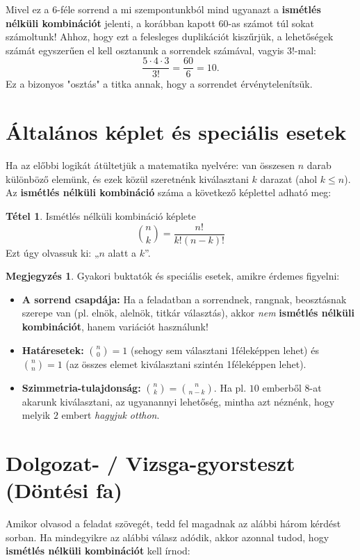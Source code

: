 \documentclass[a4paper,12pt]{article}
\theoremstyle{definition} %
\newtheorem*{theorem}{Tétel}
\newtheorem*{remark}{\mytriangle{bvred} Megjegyzés}
\begin{document}
Mivel ez a $6$-féle sorrend a mi szempontunkból mind ugyanazt a \textbf{ismétlés nélküli kombinációt} jelenti, a korábban kapott $60$-as számot túl sokat számoltunk! Ahhoz, hogy ezt a felesleges duplikációt kiszűrjük, a lehetőségek számát egyszerűen el kell osztanunk a sorrendek számával, vagyis $3!$-mal:
$$\frac{5 \cdot 4 \cdot 3}{3!} = \frac{60}{6} = 10.$$
Ez a bizonyos "osztás" a titka annak, hogy a sorrendet érvénytelenítsük.

\section{Általános képlet és speciális esetek}
Ha az előbbi logikát átültetjük a matematika nyelvére: van összesen $n$ darab különböző elemünk, és ezek közül szeretnénk kiválasztani $k$ darazat (ahol $k \le n$). Az \textbf{ismétlés nélküli kombináció} száma a következő képlettel adható meg:

\begin{theorem}{Ismétlés nélküli kombináció képlete}
$$\binom{n}{k} = \frac{n!}{k!(n-k)!}$$
Ezt úgy olvassuk ki: „$n$ alatt a $k$”.
\end{theorem}

\begin{remark}
Gyakori buktatók és speciális esetek, amikre érdemes figyelni:
\begin{itemize}
    \item \textbf{A sorrend csapdája:} Ha a feladatban a sorrendnek, rangnak, beosztásnak szerepe van (pl. elnök, alelnök, titkár választás), akkor \textit{nem} \textbf{ismétlés nélküli kombinációt}, hanem variációt használunk!
    \item \textbf{Határesetek:} $\binom{n}{0} = 1$ (sehogy sem választani 1féleképpen lehet) és $\binom{n}{n} = 1$ (az összes elemet kiválasztani szintén 1féleképpen lehet).
    \item \textbf{Szimmetria-tulajdonság:} $\binom{n}{k} = \binom{n}{n-k}$. Ha pl. $10$ emberből $8$-at akarunk kiválasztani, az ugyanannyi lehetőség, mintha azt néznénk, hogy melyik $2$ embert \textit{hagyjuk otthon}.
\end{itemize}
\end{remark}

\section{Dolgozat- / Vizsga-gyorsteszt (Döntési fa)}
Amikor olvasod a feladat szövegét, tedd fel magadnak az alábbi három kérdést sorban. Ha mindegyikre az alábbi válasz adódik, akkor azonnal tudod, hogy \textbf{ismétlés nélküli kombinációt} kell írnod:
\end{document}
